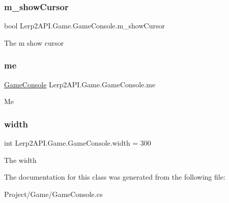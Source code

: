 \subsubsection{\texorpdfstring{m\+\_\+show\+Cursor}{m\_showCursor}}
{\footnotesize\ttfamily bool Lerp2\+A\+P\+I.\+Game.\+Game\+Console.\+m\+\_\+show\+Cursor}



The m show cursor 

\mbox{\label{class_lerp2_a_p_i_1_1_game_1_1_game_console_a9182dad70d48386914d0aa424eee2cdf}} 
\subsubsection{\texorpdfstring{me}{me}}
{\footnotesize\ttfamily \hyperlink{class_lerp2_a_p_i_1_1_game_1_1_game_console}{Game\+Console} Lerp2\+A\+P\+I.\+Game.\+Game\+Console.\+me\hspace{0.3cm}{\ttfamily [static]}}



Me 

\mbox{\label{class_lerp2_a_p_i_1_1_game_1_1_game_console_aeb707b7f970042ffeb28ae650deb5947}} 
\subsubsection{\texorpdfstring{width}{width}}
{\footnotesize\ttfamily int Lerp2\+A\+P\+I.\+Game.\+Game\+Console.\+width = 300}



The width 



The documentation for this class was generated from the following file\+:\begin{DoxyCompactItemize}
\item 
Project/\+Game/Game\+Console.\+cs\end{DoxyCompactItemize}

